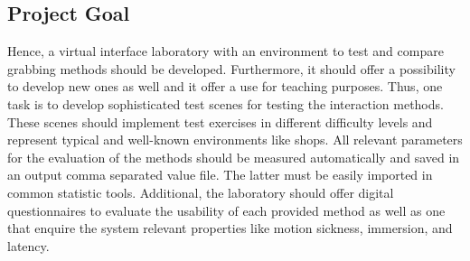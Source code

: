 \subsection{Project Goal}\label{sec:Project Goal}
Hence, a virtual interface laboratory with an environment to test and compare grabbing methods should be developed. Furthermore, it should offer a possibility to develop new ones as well and it offer a use for teaching purposes. Thus, one task is to develop sophisticated test scenes for testing the interaction methods. These scenes should implement test exercises in different difficulty levels and represent typical and well-known environments like shops. All relevant parameters for the evaluation of the methods should be measured automatically and saved in an output comma separated value file. The latter must be easily imported in common statistic tools. Additional, the laboratory should offer digital questionnaires to evaluate the usability of each provided method as well as one that enquire the system relevant properties like motion sickness, immersion, and latency.


\newpage


















